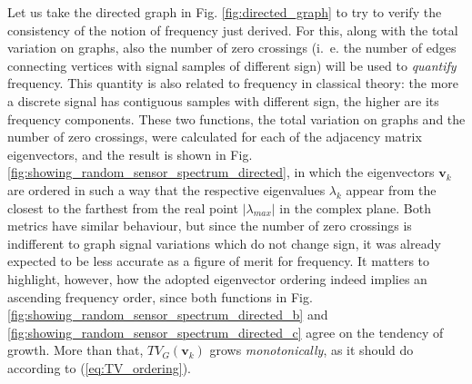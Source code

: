 Let us take the directed graph in Fig. \ref{fig:directed_graph} to try to verify the consistency of the notion of frequency just derived. For this, along with the total variation on graphs, also the number of zero crossings (i.~e. the number of edges connecting vertices with signal samples of different sign) will be used to \emph{quantify} frequency. This quantity is also related to frequency in classical theory: the more a discrete signal has contiguous samples with different sign, the higher are its frequency components. These two functions, the total variation on graphs and the number of zero crossings, were calculated for each of the adjacency matrix eigenvectors, and the result is shown in Fig. \ref{fig:showing_random_sensor_spectrum_directed}, in which the eigenvectors $ \mathbf{v}_k $ are ordered in such a way that the respective eigenvalues $ \lambda_k $ appear from the closest to the farthest from the real point $ |\lambda_{max}| $ in the complex plane. Both metrics have similar behaviour, but since the number of zero crossings is indifferent to graph signal variations which do not change sign, it was already expected to be less accurate as a figure of merit for frequency. It matters to highlight, however, how the adopted eigenvector ordering indeed implies an ascending frequency order, since both functions in Fig. \ref{fig:showing_random_sensor_spectrum_directed_b} and \ref{fig:showing_random_sensor_spectrum_directed_c} agree on the tendency of growth. More than that, $ TV_G(\mathbf{v}_k) $ grows \emph{monotonically}, as it should do according to (\ref{eq:TV_ordering}).


